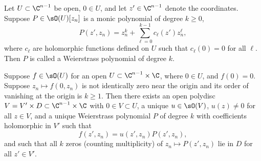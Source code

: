 \begin{definition}
Let $U\subset\C^{n-1}$ be open, $0\in U$, and let $z'\in\C^{n-1}$ denote the coordinates. Suppose $P\in\sO(U)[z_n]$ is a monic polynomial of degree $k\geq0$,
\[
P(z',z_n)=z_n^k+\sum_{\ell=0}^{k-1}c_\ell(z')z_n^\ell,
\]
where $c_\ell$ are holomorphic functions defined on $U$ such that $c_\ell(0)=0$ for all $\ell$. Then $P$ is called a Weierstrass polynomial of degree $k$.
\end{definition}
\begin{theorem}
Suppose $f\in\sO(U)$ for an open $U\subset\C^{n-1}\times\C$, where $0\in U$, and $f(0)=0$. Suppose $z_n\mapsto f(0,z_n)$ is not identically zero near the origin and its order of vanishing at the origin is $k\geq1$. Then there exists an open polydisc $V=V'\times D\subset\C^{n-1}\times\C$ with $0\in V\subset U$, a unique $u\in\sO(V)$, $u(z)\neq0$ for all $z\in V$, and a unique Weierstrass polynomial $P$ of degree $k$ with coefficients holomorphic in $V'$ such that
\[
f(z',z_n)=u(z',z_n)P(z',z_n),
\]
and such that all $k$ zeros (counting multiplicity) of $z_n\mapsto P(z',z_n)$ lie in $D$ for all $z'\in V'$.
\end{theorem}
